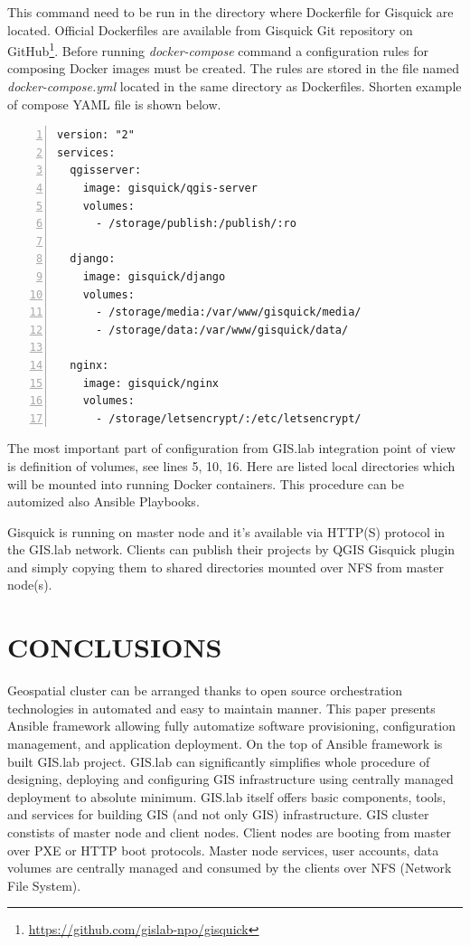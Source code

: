 \documentclass{isprs}
\begin{document}
This command need to be run in the directory where Dockerfile for
Gisquick are located. Official Dockerfiles are available from Gisquick
Git repository on
GitHub\footnote{\url{https://github.com/gislab-npo/gisquick}}. Before
running \textit{docker-compose} command a configuration rules for
composing Docker images must be created. The rules are stored in the
file named \textit{docker-compose.yml} located in the same directory
as Dockerfiles. Shorten example of compose YAML file is shown below.

\begin{lstlisting}[numbers=left,xleftmargin=1em]
version: "2"
services:
  qgisserver:
    image: gisquick/qgis-server
    volumes:
      - /storage/publish:/publish/:ro

  django:
    image: gisquick/django
    volumes:
      - /storage/media:/var/www/gisquick/media/
      - /storage/data:/var/www/gisquick/data/

  nginx:
    image: gisquick/nginx
    volumes:
      - /storage/letsencrypt/:/etc/letsencrypt/
\end{lstlisting}

The most important part of configuration from GIS.lab integration
point of view is definition of volumes, see lines 5, 10, 16. Here are
listed local directories which will be mounted into running Docker
containers. This procedure can be automized also Ansible Playbooks.

Gisquick is running on master node and it's available via HTTP(S)
protocol in the GIS.lab network. Clients can publish their projects by
QGIS Gisquick plugin and simply copying them to shared directories
mounted over NFS from master node(s).

\section{CONCLUSIONS}

Geospatial cluster can be arranged thanks to open source orchestration
technologies in automated and easy to maintain manner. This paper
presents Ansible framework allowing fully automatize software
provisioning, configuration management, and application deployment. On
the top of Ansible framework is built GIS.lab project. GIS.lab can
significantly simplifies whole procedure of designing, deploying and
configuring GIS infrastructure using centrally managed deployment to
absolute minimum. GIS.lab itself offers basic components, tools, and
services for building GIS (and not only GIS) infrastructure. GIS
cluster constists of master node and client nodes. Client nodes are
booting from master over PXE or HTTP boot protocols. Master node
services, user accounts, data volumes are centrally managed and
consumed by the clients over NFS (Network File System).
\end{document}

